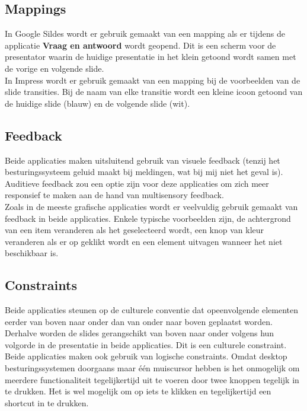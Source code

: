 \documentclass[a4paper]{article}
\begin{document}
\subsection{Mappings}
In Google Sildes wordt er gebruik gemaakt van een mapping als er tijdens de applicatie \textbf{Vraag en antwoord} wordt geopend. Dit is een scherm voor de presentator waarin de huidige presentatie in het klein getoond wordt samen met de vorige en volgende slide.\\
In Impress wordt er gebruik gemaakt van een mapping bij de voorbeelden van de slide transities. Bij de naam van elke transitie wordt een kleine icoon getoond van de huidige slide (blauw) en de volgende slide (wit).
\subsection{Feedback}
Beide applicaties maken uitsluitend gebruik van visuele feedback (tenzij het besturingssysteem geluid maakt bij meldingen, wat bij mij niet het geval is). Auditieve feedback zou een optie zijn voor deze applicaties om zich meer responsief te maken aan de hand van multisensory feedback.\\
Zoals in de meeste grafische applicaties wordt er veelvuldig gebruik gemaakt van feedback in beide applicaties. Enkele typische voorbeelden zijn, de achtergrond van een item veranderen als het geselecteerd wordt, een knop van kleur veranderen als er op geklikt wordt en een element uitvagen wanneer het niet beschikbaar is.
\subsection{Constraints}
Beide applicaties steunen op de culturele conventie dat opeenvolgende elementen eerder van boven naar onder dan van onder naar boven geplaatst worden. Derhalve worden de slides gerangschikt van boven naar onder volgens hun volgorde in de presentatie in beide applicaties. Dit is een culturele constraint.\\
Beide applicaties maken ook gebruik van logische constraints. Omdat desktop besturingssystemen doorgaans maar \'e\'en muiscursor hebben is het onmogelijk om meerdere functionaliteit tegelijkertijd uit te voeren door twee knoppen tegelijk in te drukken. Het is wel mogelijk om op iets te klikken en tegelijkertijd een shortcut in te drukken.
\end{document}
